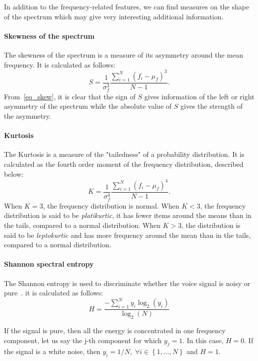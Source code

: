 In addition to the frequency-related features, we can find measures on the shape of the spectrum which may give very interesting additional information. 
\paragraph{Skewness of the spectrum}
The skewness of the spectrum is a measure of its asymmetry around the mean frequency. It is calculated as follows:
\begin{equation}
\label{eq_skew}
	S = \frac{1}{\sigma_f^3}\frac{\sum\limits_{i=1}^{N} \left(f_i - \mu_f\right)^3}{N-1}.
\end{equation}
From~\eqref{eq_skew}, it is clear that the sign of $S$ gives information of the left or right asymmetry of the spectrum while the absolute value of $S$ gives the strength of the asymmetry. 
\paragraph{Kurtosis}
The Kurtosis is a measure of the "tailedness" of a probability distribution. It is calculated as the fourth order moment of the frequency distribution, described below:
\begin{equation}
\label{eq_kurtosis}
	K = \frac{1}{\sigma_f^4}\frac{\sum\limits_{i=1}^{N} \left(f_i - \mu_f\right)^4}{N-1}.
\end{equation}
When $K=3$, the frequency distribution is normal. When $K<3$, the frequency distribution is said to be \textit{platikurtic}, it has fewer items around the means than in the tails, compared to a normal distribution. When $K>3$, the distribution is said to be \textit{leptokurtic} and has more frequency around the mean than in the tails, compared to a normal distribution.
\paragraph{Shannon spectral entropy}
The Shannon entropy is used to discriminate whether the voice signal is noisy or pure~\cite{Nunes2004}. it is calculated as follows:
\begin{equation}
\label{eq:entropy}
	H = \frac{-\sum\limits_{i=1}^{N} y_i \log_2 \left(y_i\right)}{\log_2 \left(N\right)}
\end{equation}

If the signal is pure, then all the energy is concentrated in one frequency component, let us say the j-th component for which $y_j = 1$. In this case, $H=0$. If the signal is a white noise, then $y_i = 1/N, \; \forall i \in \left\lbrace 1,...,N \right\rbrace$ and $H=1$.
